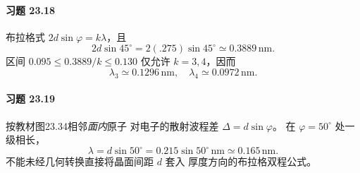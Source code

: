 \paragraph{习题 23.18}
布拉格式 \(2d\sin\varphi=k\lambda\)，且
\[
2d\sin45^\circ=2(.275)\sin45^\circ
\simeq0.3889\,\mathrm{nm}.
\]
区间 \(0.095\le0.3889/k\le0.130\)
仅允许 \(k=3,4\)，因而
\[
\boxed{\lambda_3\simeq0.1296\,\mathrm{nm},\quad
\lambda_4\simeq0.0972\,\mathrm{nm}}.
\]
\paragraph{习题 23.19}
按教材图23.34相邻\emph{面内}原子
对电子的散射波程差
\(\Delta=d\sin\varphi\)。
在 \(\varphi=50^\circ\) 处一级相长，
\[
\boxed{\lambda=d\sin50^\circ
=0.215\sin50^\circ\,\mathrm{nm}
\simeq0.165\,\mathrm{nm}}.
\]
不能未经几何转换直接将晶面间距 \(d\) 套入
厚度方向的布拉格双程公式。
